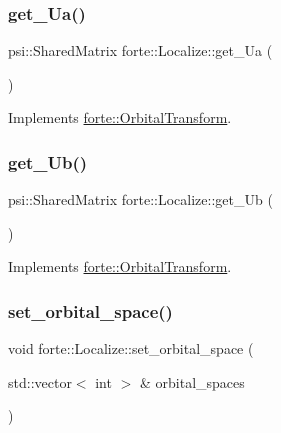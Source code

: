 \subsubsection{\texorpdfstring{get\+\_\+\+Ua()}{get\_Ua()}}
{\footnotesize\ttfamily psi\+::\+Shared\+Matrix forte\+::\+Localize\+::get\+\_\+\+Ua (\begin{DoxyParamCaption}{ }\end{DoxyParamCaption})\hspace{0.3cm}{\ttfamily [virtual]}}



Implements \mbox{\hyperlink{classforte_1_1_orbital_transform_aedd124480b35eba56653109578c05ec9}{forte\+::\+Orbital\+Transform}}.

\mbox{\label{classforte_1_1_localize_add8ecbbd32ef5910a229d6a7225b4be9}} 
\subsubsection{\texorpdfstring{get\+\_\+\+Ub()}{get\_Ub()}}
{\footnotesize\ttfamily psi\+::\+Shared\+Matrix forte\+::\+Localize\+::get\+\_\+\+Ub (\begin{DoxyParamCaption}{ }\end{DoxyParamCaption})\hspace{0.3cm}{\ttfamily [virtual]}}



Implements \mbox{\hyperlink{classforte_1_1_orbital_transform_aeb179f5b68883cf346dde354c05fd27b}{forte\+::\+Orbital\+Transform}}.

\mbox{\label{classforte_1_1_localize_aad7798a16102c6a3d38ba62bcbc7f500}} 
\subsubsection{\texorpdfstring{set\+\_\+orbital\+\_\+space()}{set\_orbital\_space()}\hspace{0.1cm}{\footnotesize\ttfamily [1/2]}}
{\footnotesize\ttfamily void forte\+::\+Localize\+::set\+\_\+orbital\+\_\+space (\begin{DoxyParamCaption}\item[{std\+::vector$<$ int $>$ \&}]{orbital\+\_\+spaces }\end{DoxyParamCaption})}

